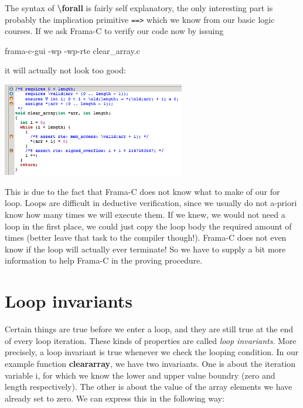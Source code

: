The syntax of \textbf{\textbackslash forall} is fairly self explanatory, the only interesting part is probably the implication primitive \texttt{==>} which we know from our basic logic courses. If we ask Frama-C to verify our code now by issuing 

\begin{ubuntu}
frama-c-gui -wp -wp-rte clear_array.c
\end{ubuntu}

it will actually not look too good:

\begin{center}
    \includegraphics[width=0.6\textwidth]{images/frama_c_clear_array_post.png}
\end{center}

This is due to the fact that Frama-C does not know what to make of our for loop. Loops are difficult in deductive verification, since we usually do not a-priori know how many times we will execute them. If we knew, we would not need a loop in the first place, we could just copy the loop body the required amount of times (better leave that task to the compiler though!). Frama-C does not even know if the loop will actually ever terminate! So we have to supply a bit more information to help Frama-C in the proving procedure.

\section{Loop invariants} 

Certain things are true before we enter a loop, and they are still true at the end of every loop iteration. These kinds of properties are called \emph{loop invariants}. More precisely, a loop invariant is true whenever we check the looping condition. In our example function \textbf{clear\textunderscore array}, we have two invariants. One is about the iteration variable i, for which we know the lower and upper value boundry (zero and length respectively). The other is about the value of the array elements we have already set to zero. We can express this in the following way:

